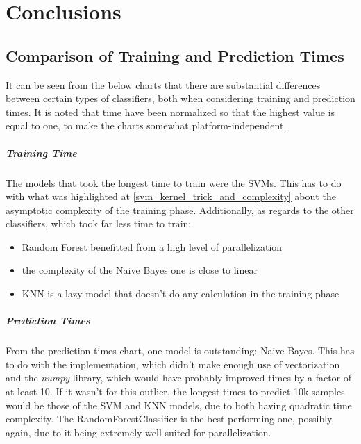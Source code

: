 \chapter{Conclusions}

\section{Comparison of Training and Prediction Times}

It can be seen from the below charts that there are substantial differences between certain types of classifiers, both when considering training and prediction times.
It is noted that time have been normalized so that the highest value is equal to one, to make the charts somewhat platform-independent.

\paragraph{Training Time} The models that took the longest time to train were the SVMs. This has to do with what was highlighted at \ref{svm_kernel_trick_and_complexity} about the asymptotic complexity of the training phase. Additionally, as regards to the other classifiers, which took far less time to train:

\begin{itemize}
    \item Random Forest benefitted from a high level of parallelization
    \item the complexity of the Naive Bayes one is close to linear
    \item KNN is a lazy model that doesn't do any calculation in the training phase
\end{itemize}

\paragraph{Prediction Times} From the prediction times chart, one model is outstanding: Naive Bayes. This has to do with the implementation, which didn't make enough use of vectorization and the \textit{numpy} library, which would have probably improved times by a factor of at least 10. If it wasn't for this outlier, the longest times to predict 10k samples would be those of the SVM and KNN models, due to both having quadratic time complexity. The RandomForestClassifier is the best performing one, possibly, again, due to it being extremely well suited for parallelization.

